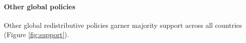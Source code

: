 

\paragraph{Other global policies}\label{subsubsec:support_other_global_policies} %

Other global redistributive policies garner majority support across all countries (Figure \ref{fig:support}).

